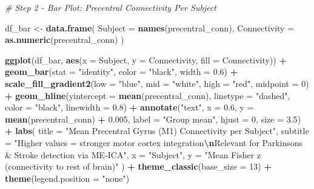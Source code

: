 \documentclass[
]{article}
\newenvironment{Shaded}{\begin{snugshade}}{\end{snugshade}}
\newcommand{\AttributeTok}[1]{\textcolor[rgb]{0.13,0.29,0.53}{#1}}
\newcommand{\CommentTok}[1]{\textcolor[rgb]{0.56,0.35,0.01}{\textit{#1}}}
\newcommand{\DecValTok}[1]{\textcolor[rgb]{0.00,0.00,0.81}{#1}}
\newcommand{\FloatTok}[1]{\textcolor[rgb]{0.00,0.00,0.81}{#1}}
\newcommand{\FunctionTok}[1]{\textcolor[rgb]{0.13,0.29,0.53}{\textbf{#1}}}
\newcommand{\NormalTok}[1]{#1}
\newcommand{\OtherTok}[1]{\textcolor[rgb]{0.56,0.35,0.01}{#1}}
\newcommand{\SpecialCharTok}[1]{\textcolor[rgb]{0.81,0.36,0.00}{\textbf{#1}}}
\newcommand{\StringTok}[1]{\textcolor[rgb]{0.31,0.60,0.02}{#1}}
\begin{document}
\begin{Shaded}
\begin{Highlighting}[]
\CommentTok{\# Step 2 {-} Bar Plot: Precentral Connectivity Per Subject}

\NormalTok{df\_bar }\OtherTok{\textless{}{-}} \FunctionTok{data.frame}\NormalTok{(}
  \AttributeTok{Subject     =} \FunctionTok{names}\NormalTok{(precentral\_conn),}
  \AttributeTok{Connectivity =} \FunctionTok{as.numeric}\NormalTok{(precentral\_conn)}
\NormalTok{)}

\FunctionTok{ggplot}\NormalTok{(df\_bar, }\FunctionTok{aes}\NormalTok{(}\AttributeTok{x =}\NormalTok{ Subject, }\AttributeTok{y =}\NormalTok{ Connectivity, }\AttributeTok{fill =}\NormalTok{ Connectivity)) }\SpecialCharTok{+}
  \FunctionTok{geom\_bar}\NormalTok{(}\AttributeTok{stat =} \StringTok{"identity"}\NormalTok{, }\AttributeTok{color =} \StringTok{"black"}\NormalTok{, }\AttributeTok{width =} \FloatTok{0.6}\NormalTok{) }\SpecialCharTok{+}
  \FunctionTok{scale\_fill\_gradient2}\NormalTok{(}\AttributeTok{low =} \StringTok{"blue"}\NormalTok{, }\AttributeTok{mid =} \StringTok{"white"}\NormalTok{, }\AttributeTok{high =} \StringTok{"red"}\NormalTok{, }\AttributeTok{midpoint =} \DecValTok{0}\NormalTok{) }\SpecialCharTok{+}
  \FunctionTok{geom\_hline}\NormalTok{(}\AttributeTok{yintercept =} \FunctionTok{mean}\NormalTok{(precentral\_conn), }\AttributeTok{linetype =} \StringTok{"dashed"}\NormalTok{,}
             \AttributeTok{color =} \StringTok{"black"}\NormalTok{, }\AttributeTok{linewidth =} \FloatTok{0.8}\NormalTok{) }\SpecialCharTok{+}
  \FunctionTok{annotate}\NormalTok{(}\StringTok{"text"}\NormalTok{, }\AttributeTok{x =} \FloatTok{0.6}\NormalTok{, }\AttributeTok{y =} \FunctionTok{mean}\NormalTok{(precentral\_conn) }\SpecialCharTok{+} \FloatTok{0.005}\NormalTok{,}
           \AttributeTok{label =} \StringTok{"Group mean"}\NormalTok{, }\AttributeTok{hjust =} \DecValTok{0}\NormalTok{, }\AttributeTok{size =} \FloatTok{3.5}\NormalTok{) }\SpecialCharTok{+}
  \FunctionTok{labs}\NormalTok{(}
    \AttributeTok{title    =} \StringTok{"Mean Precentral Gyrus (M1) Connectivity per Subject"}\NormalTok{,}
    \AttributeTok{subtitle =} \StringTok{"Higher values = stronger motor cortex integration}\SpecialCharTok{\textbackslash{}n}\StringTok{Relevant for Parkinson\textquotesingle{}s \& Stroke detection via ME{-}ICA"}\NormalTok{,}
    \AttributeTok{x        =} \StringTok{"Subject"}\NormalTok{,}
    \AttributeTok{y        =} \StringTok{"Mean Fisher z (connectivity to rest of brain)"}
\NormalTok{  ) }\SpecialCharTok{+}
  \FunctionTok{theme\_classic}\NormalTok{(}\AttributeTok{base\_size =} \DecValTok{13}\NormalTok{) }\SpecialCharTok{+}
  \FunctionTok{theme}\NormalTok{(}\AttributeTok{legend.position =} \StringTok{"none"}\NormalTok{)}
\end{Highlighting}
\end{Shaded}
\end{document}
